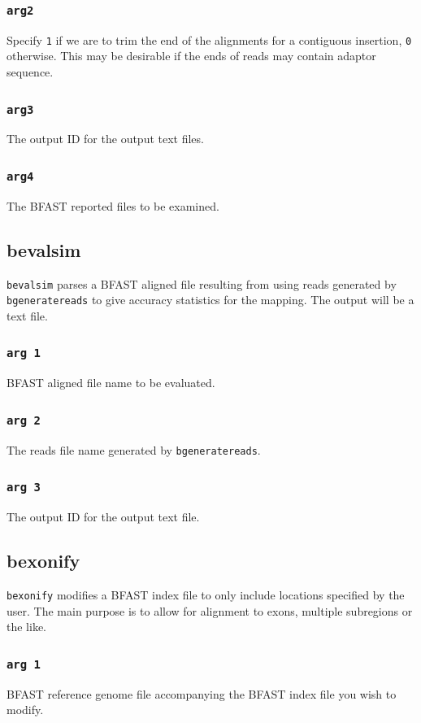 \documentclass[a4paper,12pt]{book}
\newcommand{\TT}[1]{{\tt #1}} %
\newcommand{\BRGF}{BFAST reference genome file} %
\newcommand{\BIF}{BFAST index file} %
\newcommand{\BAF}{BFAST aligned file} %
\newcommand{\BRF}{BFAST reported file} %
\begin{document}
\subsubsection{\TT{arg2}}
Specify \TT{1} if we are to trim the end of the alignments for a contiguous insertion, \TT{0} otherwise.
This may be desirable if the ends of reads may contain adaptor sequence. 
\subsubsection{\TT{arg3}}
The output ID for the output text files.
\subsubsection{\TT{arg4}}
The \BRF{s} to be examined.


\subsection{bevalsim}
\label{sec:bevalsim}
\TT{bevalsim} parses a \BAF{} resulting from using reads generated by \TT{bgeneratereads} to give accuracy statistics for the mapping.
The output will be a text file.

\subsubsection{\TT{arg 1}}
\BAF{} name to be evaluated.

\subsubsection{\TT{arg 2}}
The reads file name generated by \TT{bgeneratereads}.

\subsubsection{\TT{arg 3}}
The output ID for the output text file.

\subsection{bexonify}
\label{sec:bexonify}
\TT{bexonify} modifies a \BIF{} to only include locations specified by the user.  
The main purpose is to allow for alignment to exons, multiple subregions or the like.

\subsubsection{\TT{arg 1}}
\BRGF{} accompanying the \BIF{} you wish to modify.
\end{document}
